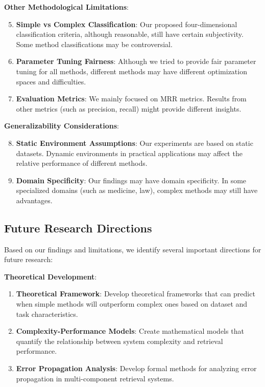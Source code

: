 \documentclass[letterpaper]{article} %
\begin{document}
\textbf{Other Methodological Limitations}:
\begin{enumerate}
\setcounter{enumi}{4}
\item \textbf{Simple vs Complex Classification}: Our proposed four-dimensional classification criteria, although reasonable, still have certain subjectivity. Some method classifications may be controversial.

\item \textbf{Parameter Tuning Fairness}: Although we tried to provide fair parameter tuning for all methods, different methods may have different optimization spaces and difficulties.

\item \textbf{Evaluation Metrics}: We mainly focused on MRR metrics. Results from other metrics (such as precision, recall) might provide different insights.
\end{enumerate}

\textbf{Generalizability Considerations}:
\begin{enumerate}
\setcounter{enumi}{7}
\item \textbf{Static Environment Assumptions}: Our experiments are based on static datasets. Dynamic environments in practical applications may affect the relative performance of different methods.

\item \textbf{Domain Specificity}: Our findings may have domain specificity. In some specialized domains (such as medicine, law), complex methods may still have advantages.
\end{enumerate}

\subsection{Future Research Directions}

Based on our findings and limitations, we identify several important directions for future research:

\textbf{Theoretical Development}:
\begin{enumerate}
\item \textbf{Theoretical Framework}: Develop theoretical frameworks that can predict when simple methods will outperform complex ones based on dataset and task characteristics.

\item \textbf{Complexity-Performance Models}: Create mathematical models that quantify the relationship between system complexity and retrieval performance.

\item \textbf{Error Propagation Analysis}: Develop formal methods for analyzing error propagation in multi-component retrieval systems.
\end{enumerate}
\end{document}
